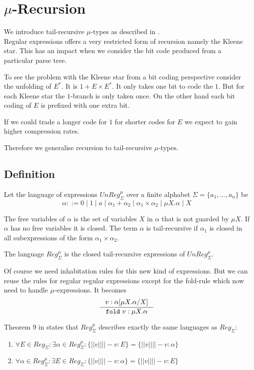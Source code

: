 \documentclass[a4paper, oneside]{memoir}
\theoremstyle{definition}
\begin{document}
\section{$\mu$-Recursion}
\label{sec:mu_recursion}

We introduce tail-recursive $\mu$-types as described in \cite{heni10}.\\[1em]

Regular expressions offers a very restricted form of recursion namely the Kleene
star. This has an impact when we consider the bit code produced from a
particular parse tree.

To see the problem with the Kleene star from a bit coding perspective consider
the unfolding of $E^{\ast}$. It is $1 + E \times E^{\ast}$. It only takes one
bit to code the $1$. But for each Kleene star the $1$-branch is only taken
once. On the other hand each bit coding of $E$ is prefixed with one extra
bit.

If we could trade a longer code for $1$ for shorter codes for $E$ we expect to
gain higher compression rates.

Therefore we generalise recursion to tail-recursive $\mu$-types.

\subsection{Definition}
Let the language of expressions $UnReg_{\Sigma}^{\mu}$ over a finite alphabet
$\Sigma = \{a_1, \ldots, a_n\}$ be
\[
\alpha ::= 0 \; | \; 1 \; | \; a \; | \; \alpha_1 + \alpha_2 \; | \; \alpha_1
\times \alpha_2 \; | \; \mu X. \alpha \; | \; X
\]

The free variables of $\alpha$ is the set of variables $X$ in $\alpha$ that is
not guarded by $\mu X$. If $\alpha$ has no free variables it is closed. The term
$\alpha$ is tail-recursive if $\alpha_1$ is closed in all subexpressions of the
form $\alpha_1 \times \alpha_2$.

The language $Reg_{\Sigma}^{\mu}$ is the closed tail-recursive expressions of
$UnReg_{\Sigma}^{\mu}$.

Of course we need inhabitation rules for this new kind of expressions. But we
can reuse the rules for regular regular expressions except for the fold-rule
which now need to handle $\mu$-expressions. It becomes
\[
\inference{v : \alpha \lbrack \mu X. \alpha / X \rbrack}{\mathtt{fold}\ v : \mu X. \alpha}
\]

Theorem 9 in \cite{heli10} states that $Reg_{\Sigma}^{\mu}$ describes exactly
the same languages as $Reg_{\Sigma}$:
\begin{enumerate}
\item $\forall E \in Reg_{\Sigma} : \exists \alpha \in Reg_{\Sigma}^{\mu} :
  \{||v|| | |- v : E\} = \{||v|| | |- v : \alpha \}$
\item $\forall \alpha \in Reg_{\Sigma}^{\mu} : \exists E \in Reg_{\Sigma} :
  \{||v|| | |- v : \alpha\} = \{||v|| | |- v : E \}$
\end{enumerate}
\end{document}
